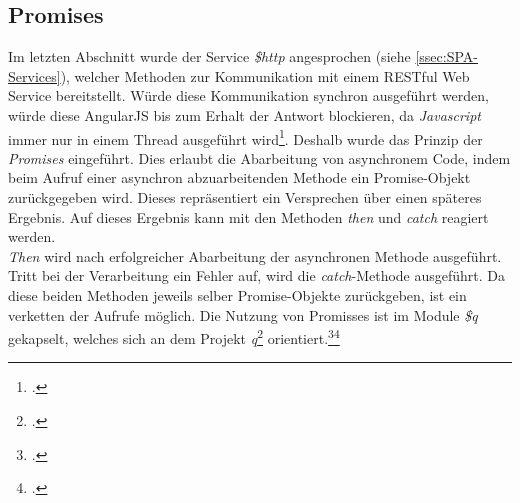 \subsection{Promises}
\label{ssec:SPA-Promises}
Im letzten Abschnitt wurde der Service \textit{\$http} angesprochen (siehe \ref{ssec:SPA-Services}), welcher Methoden zur Kommunikation mit einem \ac{REST}ful Web Service bereitstellt. Würde diese Kommunikation synchron ausgeführt werden, würde diese AngularJS bis zum Erhalt der Antwort blockieren, da \textit{\gls{Javascript}} immer nur in einem Thread ausgeführt wird\footcite{online:javascript:single-threaded}. Deshalb wurde das Prinzip der \textit{Promises} eingeführt. Dies erlaubt die Abarbeitung von asynchronem Code, indem beim Aufruf einer asynchron abzuarbeitenden Methode ein Promise-Objekt zurückgegeben wird. Dieses repräsentiert ein Versprechen über einen späteres Ergebnis. Auf dieses Ergebnis kann mit den Methoden \textit{then} und \textit{catch} reagiert werden. \\ 
\textit{Then} wird nach erfolgreicher Abarbeitung der asynchronen Methode ausgeführt. Tritt bei der Verarbeitung ein Fehler auf, wird die \textit{catch}-Methode ausgeführt. Da diese beiden Methoden jeweils selber Promise-Objekte zurückgeben, ist ein verketten der Aufrufe möglich. 
Die Nutzung von Promisses ist im Module \textit{\$q} gekapselt, welches sich an dem Projekt \textit{q}\footcite{online:doc_q} orientiert.\footcite{online:angular:module:q}\footcite[S. 211ff]{book:AngularJs:Steyer2015}
